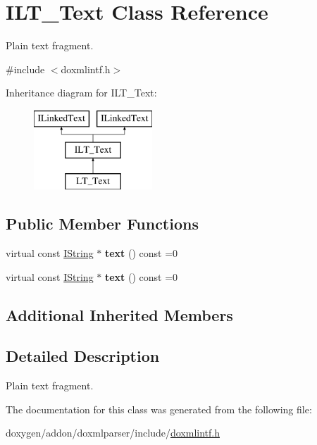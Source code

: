 \hypertarget{class_i_l_t___text}{}\section{I\+L\+T\+\_\+\+Text Class Reference}
\label{class_i_l_t___text}


Plain text fragment.  




{\ttfamily \#include $<$doxmlintf.\+h$>$}

Inheritance diagram for I\+L\+T\+\_\+\+Text\+:\begin{figure}[H]
\begin{center}
\leavevmode
\includegraphics[height=3.000000cm]{class_i_l_t___text}
\end{center}
\end{figure}
\subsection*{Public Member Functions}
\begin{DoxyCompactItemize}
\item 
\mbox{\label{class_i_l_t___text_aa731b35f5e862f775d83e15002487aee}} 
virtual const \mbox{\hyperlink{class_i_string}{I\+String}} $\ast$ {\bfseries text} () const =0
\item 
\mbox{\label{class_i_l_t___text_aa731b35f5e862f775d83e15002487aee}} 
virtual const \mbox{\hyperlink{class_i_string}{I\+String}} $\ast$ {\bfseries text} () const =0
\end{DoxyCompactItemize}
\subsection*{Additional Inherited Members}


\subsection{Detailed Description}
Plain text fragment. 

The documentation for this class was generated from the following file\+:\begin{DoxyCompactItemize}
\item 
doxygen/addon/doxmlparser/include/\mbox{\hyperlink{include_2doxmlintf_8h}{doxmlintf.\+h}}\end{DoxyCompactItemize}

